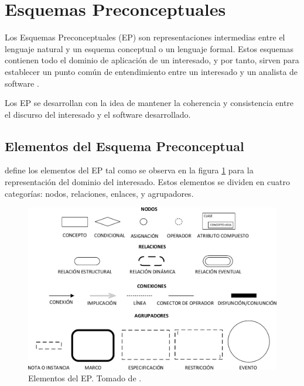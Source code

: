 
\section{Esquemas Preconceptuales}

Los Esquemas Preconceptuales (EP) son representaciones intermedias entre el lenguaje natural y un esquema conceptual o un lenguaje formal. Estos esquemas contienen todo el dominio de aplicación de un interesado, y por tanto, sirven para establecer un punto común de entendimiento entre un interesado y un analista de software \citep{zapata2007phd}.

Los EP se desarrollan con la idea de mantener la coherencia y consistencia entre el discurso del interesado y el software desarrollado. 

\subsection{Elementos del Esquema Preconceptual}
\cite{zapata2012unc} define los elementos del EP tal como se observa en la figura \ref{fig:InitialPS} para la representación del dominio del interesado. Estos elementos se dividen en cuatro categorías: nodos, relaciones, enlaces, y agrupadores.\\

\begin{figure}[h]
	\centering%
	\includegraphics[scale=0.51]{Fig/ElementosDelEP.pdf}%
	\caption[Elementos del EP.]{Elementos del EP. Tomado de \citep{zapata2012unc}.} \label{fig:InitialPS}
\end{figure}

